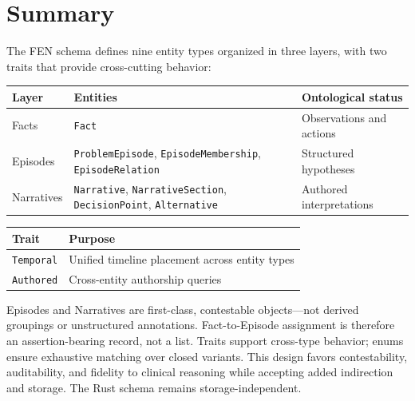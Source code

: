 \documentclass[11pt]{article}
\begin{document}
\section{Summary}
\enlargethispage{\baselineskip}

The FEN schema defines nine entity types organized in three layers, with
two traits that provide cross-cutting behavior:

\begin{center}
\footnotesize
\renewcommand{\arraystretch}{1.15}
\begin{tabular}{l l l}
\textbf{Layer} & \textbf{Entities} & \textbf{Ontological status} \\
\hline
Facts      & \texttt{Fact}
           & Observations and actions \\
Episodes   & \texttt{ProblemEpisode}, \texttt{EpisodeMembership}, \texttt{EpisodeRelation}
           & Structured hypotheses \\
Narratives & \texttt{Narrative}, \texttt{NarrativeSection}, \texttt{DecisionPoint}, \texttt{Alternative}
           & Authored interpretations \\
\end{tabular}

\medskip

\begin{tabular}{l l}
\textbf{Trait} & \textbf{Purpose} \\
\hline
\texttt{Temporal}    & Unified timeline placement across entity types \\
\texttt{Authored}    & Cross-entity authorship queries \\
\end{tabular}
\end{center}

{\small Episodes and Narratives are first-class, contestable objects---not
derived groupings or unstructured annotations. Fact-to-Episode assignment is
therefore an assertion-bearing record, not a list. Traits support cross-type
behavior; enums ensure exhaustive matching over closed variants. This design
favors contestability, auditability, and fidelity to clinical reasoning while
accepting added indirection and storage. The Rust schema remains
storage-independent.}
\end{document}
